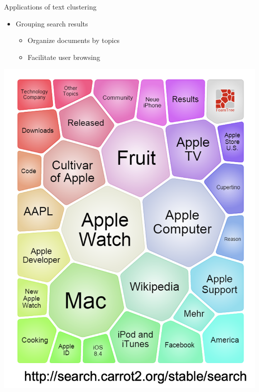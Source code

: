 \documentclass[
  ignorenonframetext,
]{beamer}
\begin{document}
\begin{frame}{Applications of text clustering}
\protect\hypertarget{applications-of-text-clustering-1}{}
\begin{itemize}
\item
  Grouping search results

  \begin{itemize}
  \item
    Organize documents by topics
  \item
    Facilitate user browsing
  \end{itemize}
\end{itemize}

\includegraphics[width=1\linewidth]{img/page 8}
\end{frame}
\end{document}
